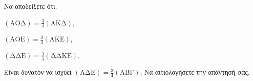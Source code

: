 \begin{alist}
\item Να αποδείξετε ότι:
    \begin{rlist}
        \item $(\text{ΑΟΔ}) = \frac{3}{4} (\text{ΑΚΔ})$, 
        \item $(\text{ΑΟE}) = \frac{3}{4} (\text{ΑΚE})$, 
        \item $(\text{ΔΔE}) = \frac{3}{4} (\text{ΔΔKE})$. 
    \end{rlist}
\item Eίναι δυνατόν να ισχύει $(\text{ΑΔE}) = \frac{3}{4} (\text{ΑΒΓ})$; Να αιτιολογήσετε την απάντησή σας. 
\end{alist}